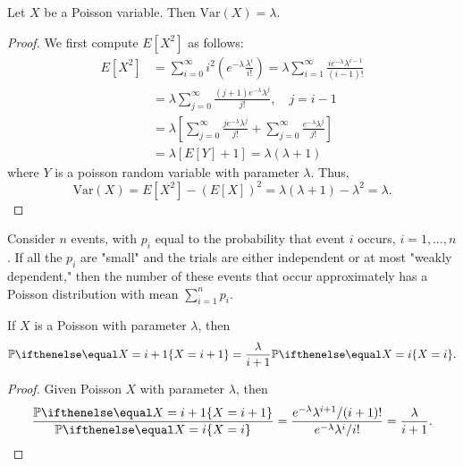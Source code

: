 \documentclass[a4paper,11pt]{article}
\begin{document}
\begin{outline}
      Let \(X\) be a Poisson variable. Then \(\text{Var}(X) = \lambda\).
      
      \begin{proof}
        We first compute \(E[X^2]\) as follows:
        \begin{align*}
          E[X^2] &= \sum_{i=0}^{\infty}i^2\left(e^{-\lambda}\frac{\lambda^i}{i!}\right)
                  = \lambda\sum_{i=1}^{\infty}\frac{ie^{-\lambda}\lambda^{i-1}}{(i-1)!} \\
                 &= \lambda\sum_{j=0}^{\infty}\frac{(j+1)e^{-\lambda}\lambda^j}{j!},\quad j=i-1 \\
                 &= \lambda\left[\sum_{j=0}^{\infty}\frac{je^{-\lambda}\lambda^j}{j!} + 
                    \sum_{j=0}^{\infty}\frac{e^{-\lambda}\lambda^j}{j!}\right] \\
                 &= \lambda\left[E[Y] + 1\right]
                  = \lambda(\lambda + 1)
        \end{align*}
        where \(Y\) is a poisson random variable with parameter \(\lambda\). Thus,
        \[\text{Var}(X) = E[X^2] - (E[X])^2 = \lambda(\lambda+1) - \lambda^2 = \lambda\text{.}\]
      \end{proof}
      
      Consider \(n\) events, with \(p_i\) equal to the probability that event \(i\) occurs, \(i=1,\ldots,n\). 
      If all the \(p_i\) are "small" and the trials are either independent or at most "weakly dependent," 
      then the number of these events that occur approximately has a Poisson distribution with mean \(\sum_{i=1}^np_i\).
      
      If \(X\) is a Poisson with parameter \(\lambda\), then \[ \bbp[X=i+1] = \frac{\lambda}{i+1}\bbp[X=i]\text{.} \]
      
      \begin{proof}
        Given Poisson \(X\) with parameter \(\lambda\), then
        \[ 
          \frac{\bbp[X=i+1]}{\bbp[X=i]} 
          = \frac{e^{-\lambda}\lambda^{i+1}/(i+1)!}{e^{-\lambda}\lambda^i/i!} 
          = \frac{\lambda}{i+1}\text{.} 
        \]
      \end{proof}
  
\end{outline}
\end{document}
